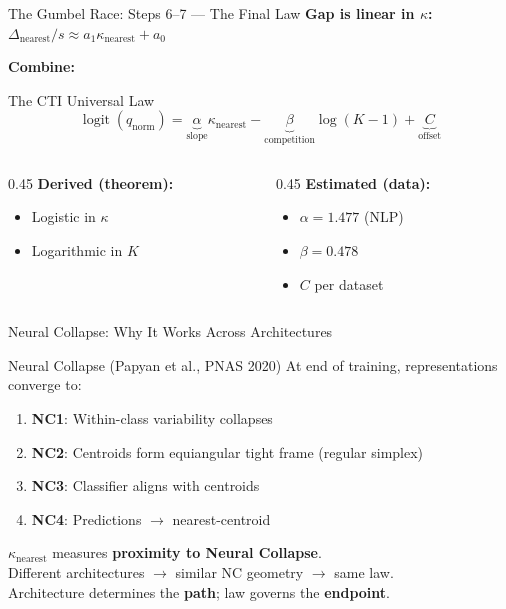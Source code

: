 \documentclass[aspectratio=169,14pt]{beamer}
\DeclareMathOperator{\logit}{logit}
\begin{document}
\begin{frame}{The Gumbel Race: Steps 6--7 --- The Final Law}
\textbf{Gap is linear in $\kappa$:}
$\Delta_\mathrm{nearest}/s \approx a_1 \kappa_\mathrm{nearest} + a_0$

\vspace{0.5cm}
\textbf{Combine:}
\begin{block}{The CTI Universal Law}
\[
\logit(q_\mathrm{norm}) = \underbrace{\alpha}_{\text{slope}} \kappa_\mathrm{nearest} - \underbrace{\beta}_{\text{competition}} \log(K{-}1) + \underbrace{C}_{\text{offset}}
\]
\end{block}

\vspace{0.3cm}
\begin{columns}[T]
\begin{column}{0.45\textwidth}
\textbf{Derived (theorem):}
\begin{itemize}
\item Logistic in $\kappa$
\item Logarithmic in $K$
\end{itemize}
\end{column}
\begin{column}{0.45\textwidth}
\textbf{Estimated (data):}
\begin{itemize}
\item $\alpha = 1.477$ (NLP)
\item $\beta = 0.478$
\item $C$ per dataset
\end{itemize}
\end{column}
\end{columns}
\end{frame}

\begin{frame}{Neural Collapse: Why It Works Across Architectures}
\begin{block}{Neural Collapse (Papyan et al., PNAS 2020)}
At end of training, representations converge to:
\begin{enumerate}
\item \textbf{NC1}: Within-class variability collapses
\item \textbf{NC2}: Centroids form equiangular tight frame (regular simplex)
\item \textbf{NC3}: Classifier aligns with centroids
\item \textbf{NC4}: Predictions $\to$ nearest-centroid
\end{enumerate}
\end{block}

\vspace{0.3cm}
\begin{center}
\large
$\kappa_\mathrm{nearest}$ measures \textbf{proximity to Neural Collapse}.\\[0.2cm]
Different architectures $\to$ similar NC geometry $\to$ same law.\\[0.2cm]
Architecture determines the \textbf{path}; law governs the \textbf{endpoint}.
\end{center}
\end{frame}
\end{document}
